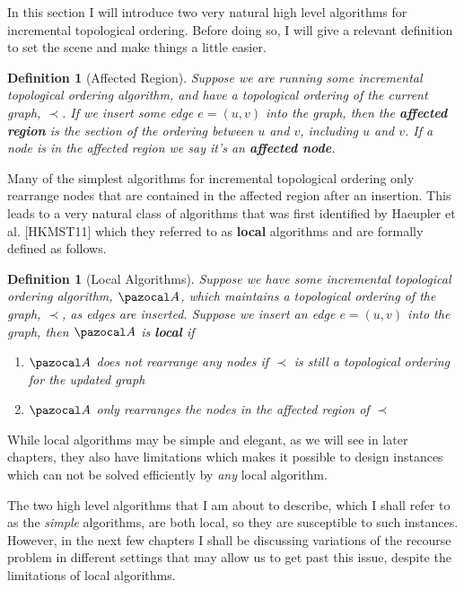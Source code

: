 \documentclass{report}
\newtheorem{definition}[theorem]{Definition}
\begin{document}
In this section I will introduce two very natural high level algorithms for incremental topological ordering. Before doing so, I will give a relevant definition to set the scene and make things a little easier.

\begin{definition}[Affected Region]
Suppose we are running some incremental topological ordering algorithm, and have a topological ordering of the current graph, $\prec$. If we insert some edge $e=(u,v)$ into the graph, then the \textbf{affected region} is the section of the ordering between $u$ and $v$, including $u$ and $v$. If a node is in the affected region we say it's an \textbf{affected node}.
\end{definition}

Many of the simplest algorithms for incremental topological ordering only rearrange nodes that are contained in the affected region after an insertion. This leads to a very natural class of algorithms that was first identified by Haeupler et al. [HKMST11] which they referred to as \textbf{local} algorithms and are formally defined as follows.

\begin{definition}[Local Algorithms]
Suppose we have some incremental topological ordering algorithm, $\pazocal A$, which maintains a topological ordering of the graph, $\prec$, as edges are inserted. Suppose we insert an edge $e=(u,v)$ into the graph, then $\pazocal A$ is \textbf{local} if
\begin{enumerate}
    \item $\pazocal A$ does not rearrange any nodes if $\prec$ is still a topological ordering for the updated graph
    \item $\pazocal A$ only rearranges the nodes in the affected region of $\prec$
\end{enumerate}
\end{definition}

While local algorithms may be simple and elegant, as we will see in later chapters, they also have limitations which makes it possible to design instances which can not be solved efficiently by \textit{any} local algorithm.

The two high level algorithms that I am about to describe, which I shall refer to as the \textit{simple} algorithms, are both local, so they are susceptible to such instances. However, in the next few chapters I shall be discussing variations of the recourse problem in different settings that may allow us to get past this issue, despite the limitations of local algorithms.
\end{document}

